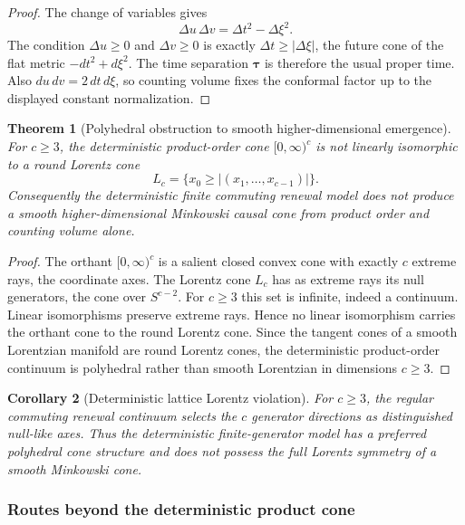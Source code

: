 \documentclass[11pt]{article}
\newtheorem{theorem}{Theorem}[section]
\newtheorem{corollary}[theorem]{Corollary}
\theoremstyle{definition}
\theoremstyle{remark}
\newcommand{\taug}{\boldsymbol{\tau}}
\begin{document}
\begin{proof}
The change of variables gives
\[
  \Delta u\,\Delta v=\Delta t^2-\Delta\xi^2.
\]
The condition $\Delta u\ge0$ and $\Delta v\ge0$ is exactly $\Delta t\ge |\Delta\xi|$, the future cone of the flat metric $-dt^2+d\xi^2$.  The time separation $\taug$ is therefore the usual proper time.  Also $du\,dv=2\,dt\,d\xi$, so counting volume fixes the conformal factor up to the displayed constant normalization.
\end{proof}

\begin{theorem}[Polyhedral obstruction to smooth higher-dimensional emergence]
\label{thm:obstruction}
For $c\ge3$, the deterministic product-order cone $[0,\infty)^c$ is not linearly isomorphic to a round Lorentz cone
\[
  L_c=\{x_0\ge |(x_1,\dots,x_{c-1})|\}.
\]
Consequently the deterministic finite commuting renewal model does not produce a smooth higher-dimensional Minkowski causal cone from product order and counting volume alone.
\end{theorem}

\begin{proof}
The orthant $[0,\infty)^c$ is a salient closed convex cone with exactly $c$ extreme rays, the coordinate axes.  The Lorentz cone $L_c$ has as extreme rays its null generators, the cone over $S^{c-2}$.  For $c\ge3$ this set is infinite, indeed a continuum.  Linear isomorphisms preserve extreme rays.  Hence no linear isomorphism carries the orthant cone to the round Lorentz cone.  Since the tangent cones of a smooth Lorentzian manifold are round Lorentz cones, the deterministic product-order continuum is polyhedral rather than smooth Lorentzian in dimensions $c\ge3$.
\end{proof}

\begin{corollary}[Deterministic lattice Lorentz violation]
\label{cor:lorentz-violation}
For $c\ge3$, the regular commuting renewal continuum selects the $c$ generator directions as distinguished null-like axes.  Thus the deterministic finite-generator model has a preferred polyhedral cone structure and does not possess the full Lorentz symmetry of a smooth Minkowski cone.
\end{corollary}

\subsubsection{Routes beyond the deterministic product cone}
\end{document}
